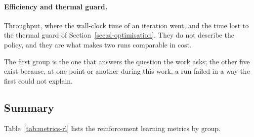 \paragraph{Efficiency and thermal guard.}
Throughput, where the wall-clock time of an iteration went, and the time lost to
the thermal guard of Section~\ref{sec:sl-optimisation}. They do not describe the
policy, and they are what makes two runs comparable in cost.

\medskip

The first group is the one that answers the question the work asks; the other
five exist because, at one point or another during this work, a run failed in a
way the first could not explain.

\subsection{Summary}

Table~\ref{tab:metrics-rl} lists the reinforcement learning metrics by group.

